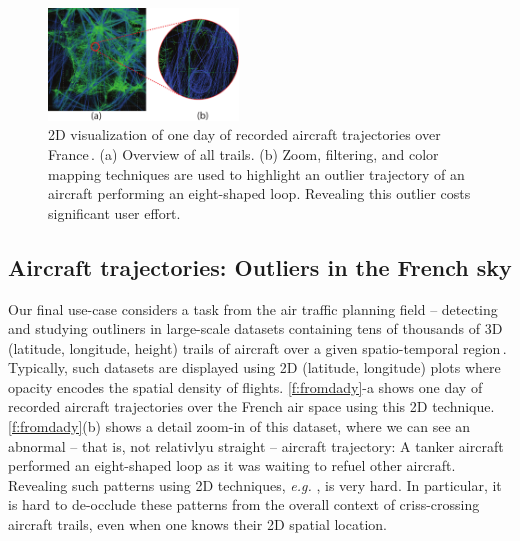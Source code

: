 \begin{figure}
\includegraphics [width=0.45\textwidth]{images/aircraft.pdf}
\vspace{-0.15cm}
\caption{2D visualization of one day of recorded aircraft trajectories over France\,\cite{hurter2009fromdady}. (a) Overview of all trails. (b) Zoom, filtering, and color mapping techniques are used to highlight an outlier trajectory of an aircraft performing an eight-shaped loop. Revealing this outlier costs significant user effort.}
\label{f:fromdady}
\vspace{-0.15cm}
\end{figure}


\subsection{Aircraft trajectories: Outliers in the French sky}
%
%
Our final use-case considers a task from the air traffic planning field -- detecting and studying outliners in large-scale datasets containing tens of thousands of 3D (latitude, longitude, height) trails of aircraft over a given spatio-temporal region\,\cite{hurter2014interactive}. Typically, such datasets are displayed using 2D (latitude, longitude) plots where opacity encodes the spatial density of flights. \autoref{f:fromdady}-a shows one day of recorded aircraft trajectories over the French air space using this 2D technique. \autoref{f:fromdady}(b) shows a detail zoom-in of this dataset, where we can see an abnormal -- that is, not relativlyu straight -- aircraft trajectory: A tanker aircraft performed an eight-shaped loop as it was waiting to refuel other aircraft. Revealing such patterns using 2D techniques, \emph{e.g.} \cite{hurter2009fromdady}, is very hard. In particular, it is hard to de-occlude these patterns from the overall context of criss-crossing aircraft trails, even when one knows their 2D spatial location.

